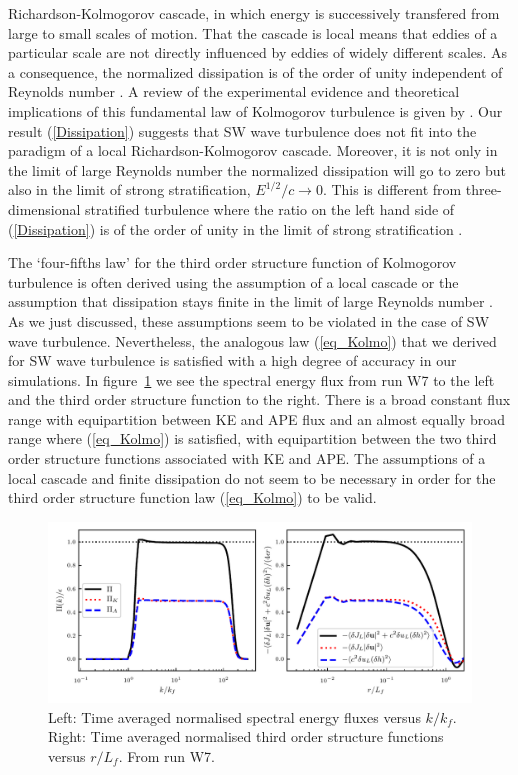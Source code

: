 Richardson-Kolmogorov cascade, in which energy is successively transfered from
large to small scales of motion. That the cascade is local means that eddies of
a particular scale are not directly influenced by eddies of widely different
scales. As a consequence, the normalized dissipation is of the order of unity
independent of Reynolds number \cite[]{Pope, TennekesLumley}. A review of the
experimental evidence and theoretical implications of this fundamental law of
Kolmogorov turbulence is given by \cite{Vassilicos2015}. Our result
(\ref{Dissipation}) suggests that SW wave turbulence does not fit into the
paradigm of a local Richardson-Kolmogorov cascade. Moreover, it is not only in
the limit of large Reynolds number the normalized dissipation will go to zero
but also in the limit of strong stratification, $ E^{1/2}/c \rightarrow 0 $.
This is different from three-dimensional stratified turbulence where the ratio
on the left hand side of (\ref{Dissipation}) is of the order of unity in the
limit of strong stratification \cite[]{Lindborg2006, Brethouwer2007}.


The `four-fifths law' for the third order structure function of Kolmogorov
turbulence is often derived using the assumption of a local cascade
\cite[]{Vassilicos2015} or the assumption that dissipation stays finite in the
limit of large Reynolds number \cite[]{Frisch}. As we just discussed, these
assumptions seem to be violated in the case of SW wave turbulence.
Nevertheless, the analogous law (\ref{eq_Kolmo}) that we derived for SW wave
turbulence is satisfied with a high degree of accuracy in our simulations. In
figure~\ref{Flux} we see the spectral energy flux from run W7 to the left and
the third order structure function to the right. There is a broad constant flux
range with equipartition between KE and APE flux and an almost equally broad
range where (\ref{eq_Kolmo}) is satisfied, with equipartition between the two
third order structure functions associated with KE and APE. The assumptions of
a local cascade and finite dissipation do not seem to be necessary in order for
the third order structure function law (\ref{eq_Kolmo}) to be valid.



\begin{figure}
\centerline{\includegraphics[width=5.8in]{../Pyfig/fig_flux_struct_combined}}
\caption{Left: Time averaged normalised spectral energy fluxes versus $ k/k_f
$. Right: Time averaged normalised third order structure functions versus $
r/L_f $. From run W7. }
\label{Flux}
\end{figure}


